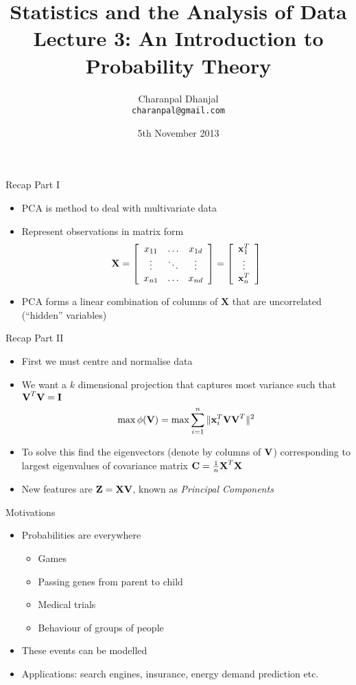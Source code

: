 \documentclass{beamer}
\title{Statistics and the Analysis of Data\\ Lecture 3: An Introduction to Probability Theory}
\author{Charanpal Dhanjal \\ \texttt{charanpal@gmail.com}}
\institute{\'{E}cole des Ponts}
\date{5th November 2013}
\begin{document}
\frame{\titlepage}


\begin{frame}{Recap Part I}  
\begin{itemize} 
\item PCA is method to deal with multivariate data 
\item Represent observations in matrix form 
\begin{displaymath} 
 \textbf{X} = \left[\begin{array}{c c c} x_{11} & \ldots & x_{1d} \\ 
                     \vdots & \ddots & \vdots \\
 x_{n1} & \ldots & x_{nd}  \end{array} \right]  = \left[\begin{array}{c} \textbf{x}_1^T \\ \vdots \\  \textbf{x}_n^T \end{array} \right]
\end{displaymath}
\item PCA forms a linear combination of columns of $\textbf{X}$ that are uncorrelated (``hidden'' variables)
\end{itemize}
\end{frame}


\begin{frame}{Recap Part II}
\begin{itemize} 
 \item First we must centre and normalise data 
\item We want a $k$ dimensional projection that captures most variance such that $\textbf{V}^T\textbf{V} = \textbf{I}$
 \begin{displaymath}
  \max \phi(\textbf{V}) = \max \sum_{i=1}^n \|\textbf{x}_{i}^T\textbf{V}\textbf{V}^T \|^2
 \end{displaymath}
 \item To solve this find the eigenvectors (denote by columns of $\textbf{V}$) corresponding to largest eigenvalues of covariance matrix $\textbf{C} = \frac{1}{n}\textbf{X}^T\textbf{X}$ 
 \item New features are $\textbf{Z} = \textbf{X}\textbf{V}$, known as \emph{Principal Components}
\end{itemize}
\end{frame}

\begin{frame}{Motivations}
\begin{itemize} 
 \item Probabilities are everywhere 
 \begin{itemize}
 \item Games
 \item Passing genes from parent to child 
 \item Medical trials
 \item Behaviour of groups of people 
 \end{itemize} 
\item These events can be modelled 
\item Applications: search engines, insurance, energy demand prediction etc. 
\end{itemize}
\end{frame}
\end{document}
